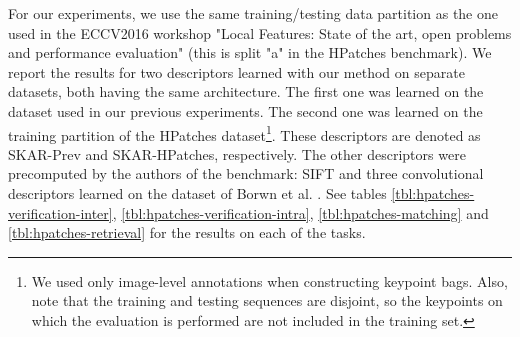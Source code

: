 \documentclass[10pt,conference,a4paper]{IEEEtran}
\begin{document}
		For our experiments, we use the same training/testing data partition as the one used in the ECCV2016 workshop "Local Features: State of the art, open problems and performance evaluation"
		(this is split "a" in the HPatches benchmark).
		We report the results for two descriptors learned with our method on separate datasets, both having the same architecture.
		The first one was learned on the dataset used in our previous experiments.
		The second one was learned on the training partition of the HPatches dataset\footnote{We used only image-level annotations when constructing keypoint bags. Also, note that the training and testing sequences are disjoint, so the keypoints on which the evaluation is performed are not included in the training set.}.
		These descriptors are denoted as SKAR-Prev and SKAR-HPatches, respectively.
		The other descriptors were precomputed by the authors of the benchmark:
		SIFT \cite{sift} and three convolutional descriptors \cite{tfeat,zagoruyko,convdesc} learned on the dataset of Borwn et al. \cite{brown}.
		See tables \ref{tbl:hpatches-verification-inter}, \ref{tbl:hpatches-verification-intra}, \ref{tbl:hpatches-matching} and \ref{tbl:hpatches-retrieval} for the results on each of the tasks.
\end{document}
